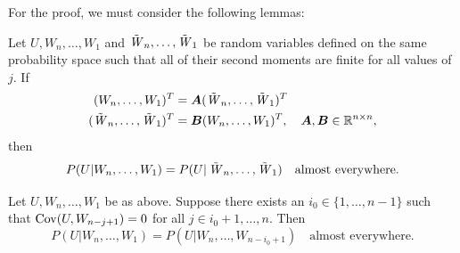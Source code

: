 \documentclass[a4paper, oneside]{discothesis}
\begin{document}
For the proof, we must consider the following lemmas:
\begin{lemma}\label{lemma1}
    Let $U, W_n, \dots, W_1$ and $\operatorname{\tilde{\mathit{W}}}_n, \dots, \operatorname{\tilde{\mathit{W}}}_1$ be random variables defined on the same probability space such that all of their second moments are finite for all values of $j$. If
    \begin{align*}
        (W_n, \dots, W_1)^T &= \boldsymbol{A}(\operatorname{\tilde{\mathit{W}}}_n, \dots, \operatorname{\tilde{\mathit{W}}}_1)^T  \\
        (\operatorname{\tilde{\mathit{W}}}_n, \dots, \operatorname{\tilde{\mathit{W}}}_1)^T &= \boldsymbol{B}(W_n, \dots, W_1)^T, \quad \boldsymbol{A}, \boldsymbol{B} \in \mathbb{R}^{n\times n},
    \end{align*}
    then 
    \begin{equation*}
        P(U|W_n, \dots, W_1) = P(U|\operatorname{\tilde{\mathit{W}}}_n, \dots, \operatorname{\tilde{\mathit{W}}}_1) \quad \text{almost everywhere.}
    \end{equation*}
\end{lemma}
\newpage
\begin{lemma}
    Let $U, W_n, \dots, W_1$ be as above. Suppose there exists an $i_0 \in \{1, \dots, n-1\}$ such that $\operatorname{\mathrm{Cov}}(U, W_{n-j+1}) = 0$ for all $j \in {i_0+1, \dots, n}.$ Then
    \begin{equation*}
        P(U| W_n, \dots, W_1) = P(U | W_n, \dots, W_{n-i_0+1}) \quad \text{almost everywhere.}
    \end{equation*}
\end{lemma}
\end{document}
